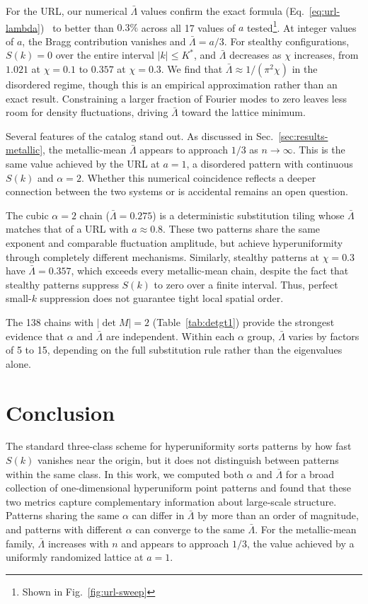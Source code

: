 \documentclass[11pt]{article}
\begin{document}
For the URL, our numerical $\bar\Lambda$ values confirm the exact formula (Eq.~\ref{eq:url-lambda})~\cite{klatt2020perturbed} to better than $0.3\%$ across all 17 values of $a$ tested\footnote{Shown in Fig.~\ref{fig:url-sweep}}. At integer values of $a$, the Bragg contribution vanishes and $\bar\Lambda = a/3$. For stealthy configurations, $S(k) = 0$ over the entire interval $|k| \leq K^*$, and $\bar\Lambda$ decreases as $\chi$ increases, from $1.021$ at $\chi = 0.1$ to $0.357$ at $\chi = 0.3$. We find that $\bar\Lambda \approx 1/(\pi^2\chi)$ in the disordered regime, though this is an empirical approximation rather than an exact result. Constraining a larger fraction of Fourier modes to zero leaves less room for density fluctuations, driving $\bar\Lambda$ toward the lattice minimum.

Several features of the catalog stand out. As discussed in Sec.~\ref{sec:results-metallic}, the metallic-mean $\bar\Lambda$ appears to approach $1/3$ as $n \to \infty$. This is the same value achieved by the URL at $a = 1$, a disordered pattern with continuous $S(k)$ and $\alpha = 2$. Whether this numerical coincidence reflects a deeper connection between the two systems or is accidental remains an open question.

The cubic $\alpha = 2$ chain ($\bar\Lambda = 0.275$) is a deterministic substitution tiling whose $\bar\Lambda$ matches that of a URL with $a \approx 0.8$. These two patterns share the same exponent and comparable fluctuation amplitude, but achieve hyperuniformity through completely different mechanisms. Similarly, stealthy patterns at $\chi = 0.3$ have $\bar\Lambda = 0.357$, which exceeds every metallic-mean chain, despite the fact that stealthy patterns suppress $S(k)$ to zero over a finite interval. Thus, perfect small-$k$ suppression does not guarantee tight local spatial order.

The 138 chains with $|\det M| = 2$ (Table~\ref{tab:detgt1}) provide the strongest evidence that $\alpha$ and $\bar\Lambda$ are independent. Within each $\alpha$ group, $\bar\Lambda$ varies by factors of 5 to 15, depending on the full substitution rule rather than the eigenvalues alone. 

\section{Conclusion}
\label{sec:conclusion}

The standard three-class scheme for hyperuniformity sorts patterns by how fast $S(k)$ vanishes near the origin, but it does not distinguish between patterns within the same class. In this work, we computed both $\alpha$ and $\bar\Lambda$ for a broad collection of one-dimensional hyperuniform point patterns and found that these two metrics capture complementary information about large-scale structure. Patterns sharing the same $\alpha$ can differ in $\bar\Lambda$ by more than an order of magnitude, and patterns with different $\alpha$ can converge to the same $\bar\Lambda$. For the metallic-mean family, $\bar\Lambda$ increases with $n$ and appears to approach $1/3$, the value achieved by a uniformly randomized lattice at $a = 1$.
\end{document}

